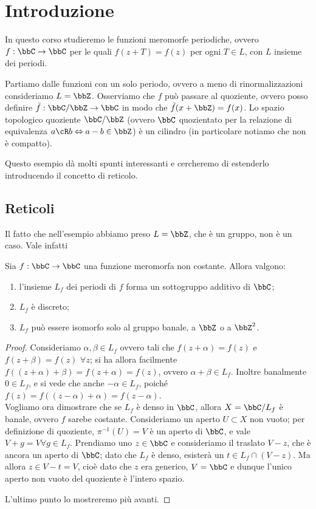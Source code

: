 \chapter{Introduzione}

In questo corso studieremo le funzioni meromorfe periodiche, ovvero $f:\bbC\to\bbC$ per le quali $f(z+T)=f(z)$ per ogni $T\in L$, con $L$ insieme dei periodi.

Partiamo dalle funzioni con un solo periodo, ovvero a meno di rinormalizzazioni consideriamo $L=\bbZ$.  Osserviamo che $f$ può passare al quoziente, ovvero posso definire $\tilde f:\bbC / \bbZ\to\bbC$ in modo che $\tilde f(x+\bbZ)=f(x)$. Lo spazio topologico quoziente $\bbC / \bbZ$ (ovvero $\bbC$ quozientato per la relazione di equivalenza $a \cR b \sse a-b \in \bbZ$) è un cilindro (in particolare notiamo che non è compatto).

Questo esempio dà molti spunti interessanti e cercheremo di estenderlo introducendo il concetto di reticolo.

\section{Reticoli}
Il fatto che nell'esempio abbiamo preso $L = \bbZ$, che è un gruppo, non è un caso. Vale infatti
\begin{lemma}
  Sia $f: \bbC \rar \bbC$ una funzione meromorfa non costante.  Allora valgono:
  \begin{enumerate}
      \item l'insieme $L_f$ dei periodi di $f$ forma un sottogruppo additivo di $\bbC$;
      \item $L_f$ è discreto;
      \item $L_f$ può essere isomorfo solo al gruppo banale, a $\bbZ$ o a $\bbZ^2$.
  \end{enumerate}
\end{lemma}
\begin{proof}
      Consideriamo $\alpha,\beta\in L_f$ ovvero tali che $f(z + \alpha) = f(z)$ e $f(z + \beta) = f(z)$ $\forall z$; si ha allora facilmente $f((z + \alpha) + \beta) = f(z + \alpha) = f(z)$, ovvero $\alpha+\beta\in L_f$. Inoltre banalmente $0\in L_f$, e si vede che anche $-\alpha\in L_f$, poiché $f(z)=f((z-\alpha)+\alpha)=f(z-\alpha)$.\\
      Vogliamo ora dimostrare che se $L_f$ è denso in $\bbC$, allora $X=\bbC / L_f$ è banale, ovvero $f$ sarebe costante. Consideriamo un aperto $U\subset X$ non vuoto; per definizione di quoziente, $\pi^{-1}(U)=V$ è un aperto di $\bbC$, e vale $V+g=V\forall g\in L_f$. Prendiamo uno $z\in\bbC$ e consideriamo il traslato $V-z$, che è ancora un aperto di $\bbC$; dato che $L_f$ è denso, esisterà un $t\in L_f\cap (V-z)$. Ma allora $z\in V-t=V$, cioè dato che $z$ era generico, $V=\bbC$ e dunque l'unico aperto non vuoto del quoziente è l'intero spazio.

      L'ultimo punto lo mostreremo più avanti.
\end{proof}

